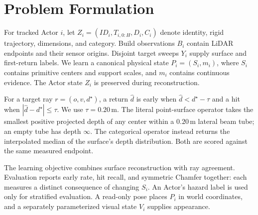 \section{Problem Formulation}
\label{sec:problem}

For tracked Actor $i$, let $Z_i=(ID_i,T_{i,0:H},D_i,C_i)$ denote identity, rigid trajectory,
dimensions, and category. Build observations $B_i$ contain LiDAR endpoints and their sensor origins.
Disjoint target sweeps $Y_i$ supply surface and first-return labels.
We learn a canonical physical state $P_i=(S_i,m_i)$, where $S_i$ contains primitive centers and support
scales, and $m_i$ contains continuous evidence. The Actor state $Z_i$ is preserved during reconstruction.

For a target ray $r=(o,v,d^\star)$, a return $\widehat d$ is early when
$\widehat d<d^\star-\tau$ and a hit when $|\widehat d-d^\star|\leq\tau$.
We use $\tau=0.20$\,m. The literal point-surface operator takes the smallest positive projected depth of
any center within a $0.20$\,m lateral beam tube; an empty tube has depth $\infty$.
The categorical operator instead returns the interpolated median of the surface's depth distribution.
Both are scored against the same measured endpoint.

The learning objective combines surface reconstruction with ray agreement. Evaluation reports early rate,
hit recall, and symmetric Chamfer together: each measures a distinct consequence of changing $S_i$.
An Actor's hazard label is used only for stratified evaluation. A read-only pose places $P_i$ in world
coordinates, and a separately parameterized visual state $V_i$ supplies appearance.
